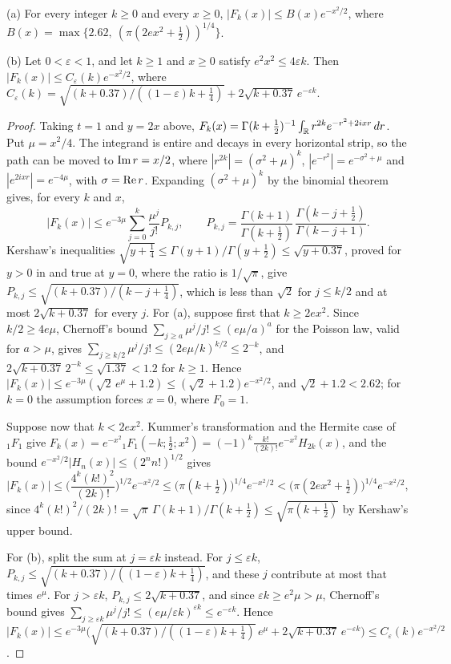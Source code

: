 \begin{lemma}\label{lem:ch12:hermite}
\textup{(a)} For every integer $k\ge0$ and every $x\ge0$, $|F_k(x)|\le B(x)e^{-x^2/2}$, where $B(x)=\max\{2.62,\ (\pi(2ex^2+\frac12))^{1/4}\}$.

\textup{(b)} Let $0<\varepsilon<1$, and let $k\ge1$ and $x\ge0$ satisfy $e^2x^2\le4\varepsilon k$. Then $|F_k(x)|\le C_\varepsilon(k)e^{-x^2/2}$, where $C_\varepsilon(k)=\sqrt{(k+0.37)/((1-\varepsilon)k+\frac14)}+2\sqrt{k+0.37}\,e^{-\varepsilon k}$.
\end{lemma}

\begin{proof}
Taking $t=1$ and $y=2x$ above, $F_k(x)=\Gamma(k+\frac12)^{-1}\int_{\mathbb{R}}r^{2k}e^{-r^2+2ixr}\,dr$. Put $\mu=x^2/4$. The integrand is entire and decays in every horizontal strip, so the path can be moved to $\operatorname{Im} r=x/2$, where $|r^{2k}|=(\sigma^2+\mu)^k$, $|e^{-r^2}|=e^{-\sigma^2+\mu}$ and $|e^{2ixr}|=e^{-4\mu}$, with $\sigma=\operatorname{Re} r$. Expanding $(\sigma^2+\mu)^k$ by the binomial theorem gives, for every $k$ and $x$,
\[
|F_k(x)|\le e^{-3\mu}\sum_{j=0}^k\frac{\mu^j}{j!}P_{k,j},\qquad P_{k,j}=\frac{\Gamma(k+1)}{\Gamma(k+\frac12)}\,\frac{\Gamma(k-j+\frac12)}{\Gamma(k-j+1)}.
\]
Kershaw's inequalities $\sqrt{y+\frac14}\le\Gamma(y+1)/\Gamma(y+\frac12)\le\sqrt{y+0.37}$, proved for $y>0$ in \cite{Kershaw83} and true at $y=0$, where the ratio is $1/\sqrt\pi$, give $P_{k,j}\le\sqrt{(k+0.37)/(k-j+\frac14)}$, which is less than $\sqrt2$ for $j\le k/2$ and at most $2\sqrt{k+0.37}$ for every $j$. For (a), suppose first that $k\ge2ex^2$. Since $k/2\ge4e\mu$, Chernoff's bound $\sum_{j\ge a}\mu^j/j!\le(e\mu/a)^a$ for the Poisson law, valid for $a>\mu$, gives $\sum_{j\ge k/2}\mu^j/j!\le(2e\mu/k)^{k/2}\le2^{-k}$, and $2\sqrt{k+0.37}\,2^{-k}\le\sqrt{1.37}<1.2$ for $k\ge1$. Hence $|F_k(x)|\le e^{-3\mu}(\sqrt2\,e^\mu+1.2)\le(\sqrt2+1.2)e^{-x^2/2}$, and $\sqrt2+1.2<2.62$; for $k=0$ the assumption forces $x=0$, where $F_0=1$.

Suppose now that $k<2ex^2$. Kummer's transformation and the Hermite case of ${}_1F_1$ \cite[(13.2.39), (13.6.16)]{DLMF} give $F_k(x)=e^{-x^2}{}_1F_1(-k;\frac12;x^2)=(-1)^k\frac{k!}{(2k)!}e^{-x^2}H_{2k}(x)$, and the bound $e^{-x^2/2}|H_n(x)|\le(2^nn!)^{1/2}$ \cite[(18.14.9)]{DLMF} gives
\[
|F_k(x)|\le\Big(\frac{4^k(k!)^2}{(2k)!}\Big)^{1/2}e^{-x^2/2}\le\big(\pi(k+\tfrac12)\big)^{1/4}e^{-x^2/2}<\big(\pi(2ex^2+\tfrac12)\big)^{1/4}e^{-x^2/2},
\]
since $4^k(k!)^2/(2k)!=\sqrt\pi\,\Gamma(k+1)/\Gamma(k+\frac12)\le\sqrt{\pi(k+\frac12)}$ by Kershaw's upper bound.

For (b), split the sum at $j=\varepsilon k$ instead. For $j\le\varepsilon k$, $P_{k,j}\le\sqrt{(k+0.37)/((1-\varepsilon)k+\frac14)}$, and these $j$ contribute at most that times $e^\mu$. For $j>\varepsilon k$, $P_{k,j}\le2\sqrt{k+0.37}$, and since $\varepsilon k\ge e^2\mu>\mu$, Chernoff's bound gives $\sum_{j\ge\varepsilon k}\mu^j/j!\le(e\mu/\varepsilon k)^{\varepsilon k}\le e^{-\varepsilon k}$. Hence $|F_k(x)|\le e^{-3\mu}\big(\sqrt{(k+0.37)/((1-\varepsilon)k+\frac14)}\,e^\mu+2\sqrt{k+0.37}\,e^{-\varepsilon k}\big)\le C_\varepsilon(k)e^{-x^2/2}$.
\end{proof}

